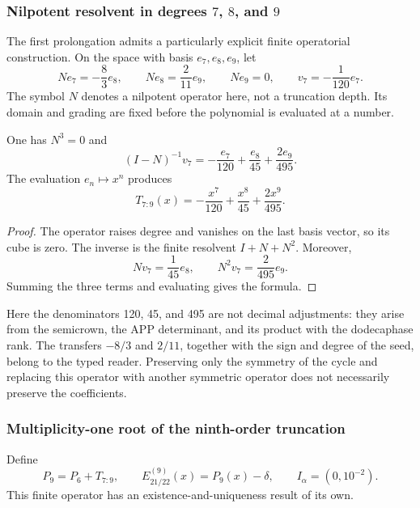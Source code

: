 \subsubsection{Nilpotent resolvent in degrees \(7\), \(8\), and \(9\)}
\label{subsec:alpha-resolvente}

The first prolongation admits a particularly explicit finite operatorial
construction. On the space with basis \(e_7,e_8,e_9\), let
\[
 Ne_7=-\frac83e_8,\qquad Ne_8=\frac2{11}e_9,\qquad Ne_9=0,
 \qquad v_7=-\frac1{120}e_7.
\]
The symbol \(N\) denotes a nilpotent operator here, not a truncation depth.
Its domain and grading are fixed before the polynomial is evaluated at a
number.

\begin{lemma}
\label{lem:alpha-resolvente}
One has \(N^3=0\) and
\[
 (I-N)^{-1}v_7
 =-\frac{e_7}{120}+\frac{e_8}{45}+\frac{2e_9}{495}.
\]
The evaluation \(e_n\mapsto x^n\) produces
\begin{equation}
 T_{7:9}(x)=-\frac{x^7}{120}+\frac{x^8}{45}+\frac{2x^9}{495}.
 \label{eq:alpha-t79}
\end{equation}
\end{lemma}

\begin{proof}
The operator raises degree and vanishes on the last basis vector, so its cube
is zero. The inverse is the finite resolvent \(I+N+N^2\). Moreover,
\[
 Nv_7=\frac1{45}e_8,\qquad N^2v_7=\frac2{495}e_9.
\]
Summing the three terms and evaluating gives the formula.
\end{proof}

Here the denominators 120, 45, and 495 are not decimal adjustments: they arise
from the semicrown, the APP determinant, and its product with the dodecaphase
rank. The transfers \(-8/3\) and \(2/11\), together with the sign and degree
of the seed, belong to the typed reader. Preserving only the symmetry of the
cycle and replacing this operator with another symmetric operator does not
necessarily preserve the coefficients.

\subsubsection{Multiplicity-one root of the ninth-order truncation}
\label{subsec:alpha-jet}

Define
\[
 P_9=P_6+T_{7:9},\qquad E_{21/22}^{(9)}(x)=P_9(x)-\delta,
 \qquad I_\alpha=(0,10^{-2}).
\]
This finite operator has an existence-and-uniqueness result of its own.

